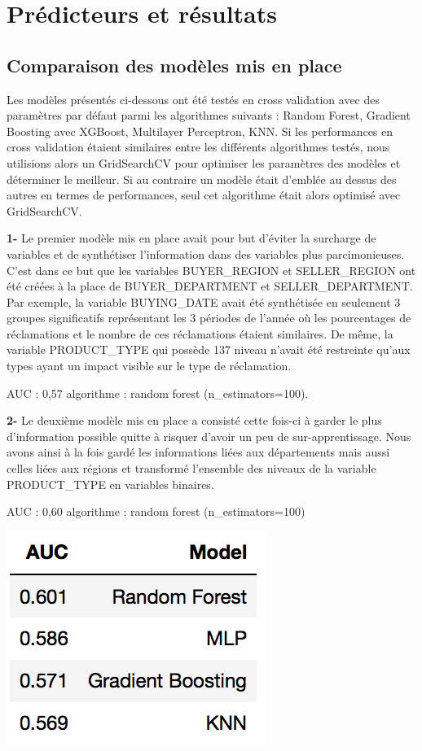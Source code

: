 
\chapter{Prédicteurs et résultats}

\section{Comparaison des modèles mis en place}

Les modèles présentés ci-dessous ont été testés en cross validation avec des
paramètres par défaut parmi les algorithmes suivants : Random Forest, Gradient Boosting 
avec XGBoost, Multilayer Perceptron, KNN.
Si les performances en cross validation étaient similaires entre les différents algorithmes
testés, nous utilisions alors un GridSearchCV pour optimiser les paramètres des modèles et
déterminer le meilleur. 
Si au contraire un modèle était d'emblée au dessus des autres en termes de performances, 
seul cet algorithme était alors optimisé avec GridSearchCV.

\textbf{1-} Le premier modèle mis en place avait pour but d'éviter la surcharge de variables et de 
synthétiser l'information dans des variables plus parcimonieuses. C'est dans ce but que les 
variables BUYER_REGION et SELLER_REGION ont été créées à la place de BUYER_DEPARTMENT et
SELLER_DEPARTMENT. Par exemple, la variable BUYING_DATE avait été synthétisée en seulement
3 groupes significatifs représentant les 3 périodes de l'année où les pourcentages de 
réclamations et le nombre de ces réclamations étaient similaires. De même, la variable
PRODUCT_TYPE qui possède 137 niveau n'avait été restreinte qu'aux types ayant un impact visible
sur le type de réclamation. 

AUC : 0,57
algorithme : random forest (n_estimators=100).

\textbf{2-} Le deuxième modèle mis en place a consisté cette fois-ci à garder le plus d'information
possible quitte à risquer d'avoir un peu de sur-apprentissage. Nous avons ainsi à la fois 
gardé les informations liées aux départements mais aussi celles liées aux régions et 
transformé l'ensemble des niveaux de la variable PRODUCT_TYPE en variables binaires.

AUC : 0,60
algorithme : random forest (n_estimators=100)

\begin{center}
\includegraphics[scale=0.5]{assets/auc1} 
\end{center}

